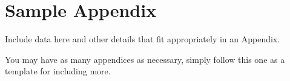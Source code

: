 \chapter{Sample Appendix}

Include data here and other details that fit appropriately in an Appendix.

You may have as many appendices as necessary, simply follow this one as a template for including more.
